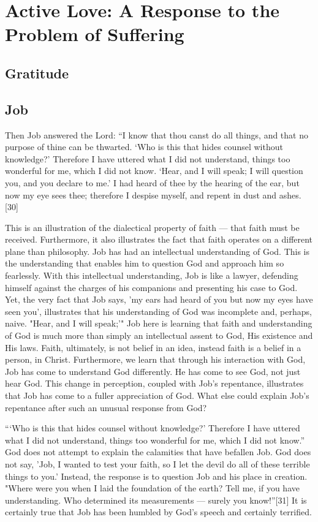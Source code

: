 \chapter{Active Love: A Response to the Problem of Suffering}
	\section{Gratitude}
	\section{Job}
	
Then Job answered the Lord: “I know that thou canst do all things, and that no purpose of thine can be thwarted. ‘Who is this that hides counsel without knowledge?’ Therefore I have uttered what I did not understand, things too wonderful for me, which I did not know. ‘Hear, and I will speak; I will question you, and you declare to me.’ I had heard of thee by the hearing of the ear, but now my eye sees thee; therefore I despise myself, and repent in dust and ashes.[30] 


This is an illustration of the dialectical property of faith — that faith must be received. Furthermore, it also illustrates the fact that faith operates on a different plane than philosophy. Job has had an intellectual understanding of God. This is the understanding that enables him to question God and approach him so fearlessly. With this intellectual understanding, Job is like a lawyer, defending himself against the charges of his companions and presenting his case to God. Yet, the very fact that Job says, 'my ears had heard of you but now my eyes have seen you', illustrates that his understanding of God was incomplete and, perhaps, naive.
"Hear, and I will speak;'" Job here is learning that faith and understanding of God is much more than simply an intellectual assent to God, His existence and His laws. Faith, ultimately, is not belief in an idea, instead faith is a belief in a person, in Christ. Furthermore, we learn that through his interaction with God, Job has come to understand God differently. He has come to see God, not just hear God. This change in perception, coupled with Job's repentance, illustrates that Job has come to a fuller appreciation of God. What else could explain Job's repentance after such an unusual response from God? 

“‘Who is this that hides counsel without knowledge?’ Therefore I have uttered what I did not understand, things too wonderful for me, which I did not know.” God does not attempt to explain the calamities that have befallen Job. God does not say, 'Job, I wanted to test your faith, so I let the devil do all of these terrible things to you.' Instead, the response is to question Job and his place in creation. "Where were you when I laid the foundation of the earth? Tell me, if you have understanding. Who determined its measurements — surely you know!”[31] It is certainly true that Job has been humbled by God's speech and certainly terrified. 

